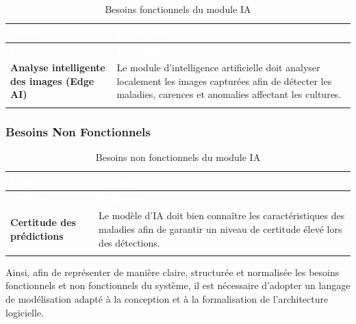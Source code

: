 {\small
	\renewcommand{\arraystretch}{1.5}
	\begin{longtable}{|p{4cm}|p{9cm}|}
		
		\hline
		\rowcolor[HTML]{2C3E50}
		\textcolor{white}{\textbf{Besoin}} &
		\textcolor{white}{\textbf{Description}}
		\\ \hline
		\endfirsthead
		
		\hline
		\rowcolor[HTML]{2C3E50}
		\textcolor{white}{\textbf{Besoin}} &
		\textcolor{white}{\textbf{Description}}
		\\ \hline
		\endhead
		
		\rowcolor[HTML]{EFEFEF}
		\textbf{Analyse intelligente des images (Edge AI)} &
		Le module d’intelligence artificielle doit analyser localement les images capturées afin de détecter les maladies, carences et anomalies affectant les cultures. 
		\\ \hline
		

		
		
		\caption{Besoins fonctionnels du module IA}
		\label{tab:bf-ia}
		
	\end{longtable}
}
\subsubsection{Besoins Non Fonctionnels}

\renewcommand{\arraystretch}{1.5}

{\small
	\renewcommand{\arraystretch}{1.5}
	\begin{longtable}{|p{4cm}|p{9cm}|}
		
		\hline
		\rowcolor[HTML]{2C3E50}
		\textcolor{white}{\textbf{Critère}} &
		\textcolor{white}{\textbf{Exigence}}
		\\ \hline
		\endfirsthead
		
		\hline
		\rowcolor[HTML]{2C3E50}
		\textcolor{white}{\textbf{Critère}} &
		\textcolor{white}{\textbf{Exigence}}
		\\ \hline
        
		\endhead
		\rowcolor[HTML]{EFEFEF}
		\textbf{Certitude des prédictions} &
		Le modèle d'IA doit bien connaître les caractéristiques des maladies afin de garantir un niveau de certitude élevé lors des détections.
		\\ \hline

		\caption{Besoins non fonctionnels du module IA}
		\label{tab:bnf-ia}
		
	\end{longtable}
}
Ainsi, afin de représenter de manière claire, structurée et normalisée les besoins fonctionnels et non fonctionnels du système, il est nécessaire d’adopter un langage de modélisation adapté à la conception et à la formalisation de l’architecture logicielle.

